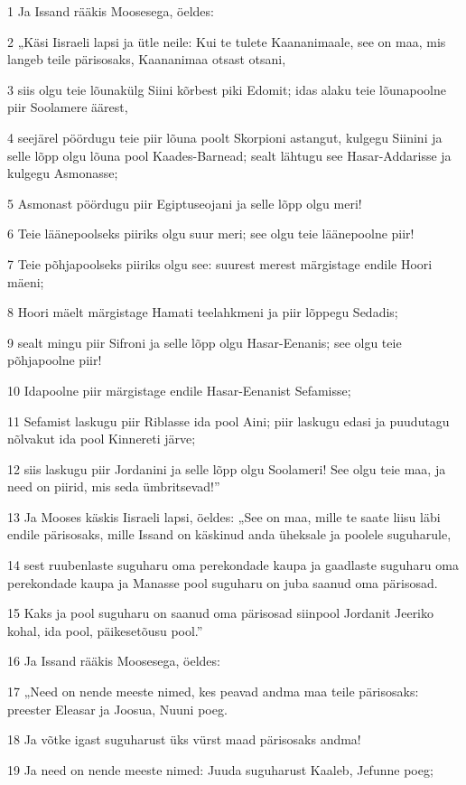 \par 1 Ja Issand rääkis Moosesega, öeldes:
\par 2 „Käsi Iisraeli lapsi ja ütle neile: Kui te tulete Kaananimaale, see on maa, mis langeb teile pärisosaks, Kaananimaa otsast otsani,
\par 3 siis olgu teie lõunakülg Siini kõrbest piki Edomit; idas alaku teie lõunapoolne piir Soolamere äärest,
\par 4 seejärel pöördugu teie piir lõuna poolt Skorpioni astangut, kulgegu Siinini ja selle lõpp olgu lõuna pool Kaades-Barnead; sealt lähtugu see Hasar-Addarisse ja kulgegu Asmonasse;
\par 5 Asmonast pöördugu piir Egiptuseojani ja selle lõpp olgu meri!
\par 6 Teie läänepoolseks piiriks olgu suur meri; see olgu teie läänepoolne piir!
\par 7 Teie põhjapoolseks piiriks olgu see: suurest merest märgistage endile Hoori mäeni;
\par 8 Hoori mäelt märgistage Hamati teelahkmeni ja piir lõppegu Sedadis;
\par 9 sealt mingu piir Sifroni ja selle lõpp olgu Hasar-Eenanis; see olgu teie põhjapoolne piir!
\par 10 Idapoolne piir märgistage endile Hasar-Eenanist Sefamisse;
\par 11 Sefamist laskugu piir Riblasse ida pool Aini; piir laskugu edasi ja puudutagu nõlvakut ida pool Kinnereti järve;
\par 12 siis laskugu piir Jordanini ja selle lõpp olgu Soolameri! See olgu teie maa, ja need on piirid, mis seda ümbritsevad!”
\par 13 Ja Mooses käskis Iisraeli lapsi, öeldes: „See on maa, mille te saate liisu läbi endile pärisosaks, mille Issand on käskinud anda üheksale ja poolele suguharule,
\par 14 sest ruubenlaste suguharu oma perekondade kaupa ja gaadlaste suguharu oma perekondade kaupa ja Manasse pool suguharu on juba saanud oma pärisosad.
\par 15 Kaks ja pool suguharu on saanud oma pärisosad siinpool Jordanit Jeeriko kohal, ida pool, päikesetõusu pool.”
\par 16 Ja Issand rääkis Moosesega, öeldes:
\par 17 „Need on nende meeste nimed, kes peavad andma maa teile pärisosaks: preester Eleasar ja Joosua, Nuuni poeg.
\par 18 Ja võtke igast suguharust üks vürst maad pärisosaks andma!
\par 19 Ja need on nende meeste nimed: Juuda suguharust Kaaleb, Jefunne poeg;
